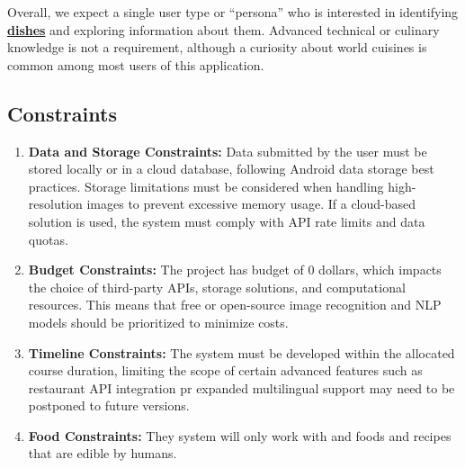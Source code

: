 \documentclass[]{article}
\begin{document}
Overall, we expect a single user type or “persona” who is interested in identifying \hyperref[Dish]{\textbf{dishes}} and exploring information about them. Advanced technical or culinary knowledge is not a requirement, although a curiosity about world cuisines is common among most users of this application.

\subsection{Constraints}
\label{sub:constraints}
\begin{enumerate}
	\item \textbf{Data and Storage Constraints: }Data submitted by the user must be stored locally or in a cloud database, following Android data storage best practices. Storage limitations must be considered when handling high-resolution images to prevent excessive memory usage. If a cloud-based solution is used, the system must comply with API rate limits and data quotas.
	\item \textbf{Budget Constraints: }The project has budget of 0 dollars, which impacts the choice of third-party APIs, storage solutions, and computational resources. This means that free or open-source image recognition and NLP models should be prioritized to minimize costs.
	\item \textbf{Timeline Constraints: }The system must be developed within the allocated course duration, limiting the scope of certain advanced features such as restaurant API integration pr expanded multilingual support may need to be postponed to future versions.
	\item \textbf{Food Constraints: } They system will only work with and foods and recipes that are edible by humans.
\end{enumerate}
\end{document}
